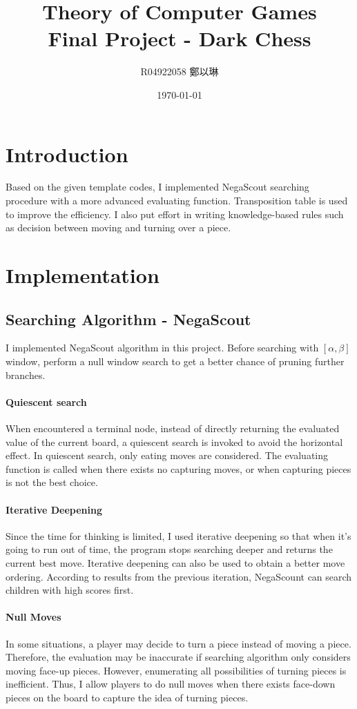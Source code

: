 \documentclass[12pt]{article}
\title{\textbf{Theory of Computer Games}\\ Final Project - Dark Chess}
\author{R04922058 鄭以琳}
\date{\large \today}
\begin{document}
\maketitle

\section{Introduction}
Based on the given template codes, I implemented NegaScout searching procedure with a more advanced evaluating function. Transposition table is used to improve the efficiency. I also put effort in writing knowledge-based rules such as decision between moving and turning over a piece.

\section{Implementation}
\subsection{Searching Algorithm - NegaScout}
	I implemented NegaScout algorithm in this project. Before searching with $[\alpha, \beta]$ window, perform a null window search to get a better chance of pruning further branches.
	\paragraph{Quiescent search}
	When encountered a terminal node, instead of directly returning the evaluated value of the current board, a quiescent search is invoked to avoid the horizontal effect. In quiescent search, only eating moves are considered. The evaluating function is called when there exists no capturing moves, or when capturing pieces is not the best choice.
	\paragraph{Iterative Deepening}
	Since the time for thinking is limited, I used iterative deepening so that when it's going to run out of time, the program stops searching deeper and returns the current best move. Iterative deepening can also be used to obtain a better move ordering. According to results from the previous iteration, NegaScount can search children with high scores first.
	\paragraph{Null Moves}
	In some situations, a player may decide to turn a piece instead of moving a piece. Therefore, the evaluation may be inaccurate if searching algorithm only considers moving face-up pieces. However, enumerating all possibilities of turning pieces is inefficient. Thus, I allow players to do null moves when there exists face-down pieces on the board to capture the idea of turning pieces.
	
\end{document}
